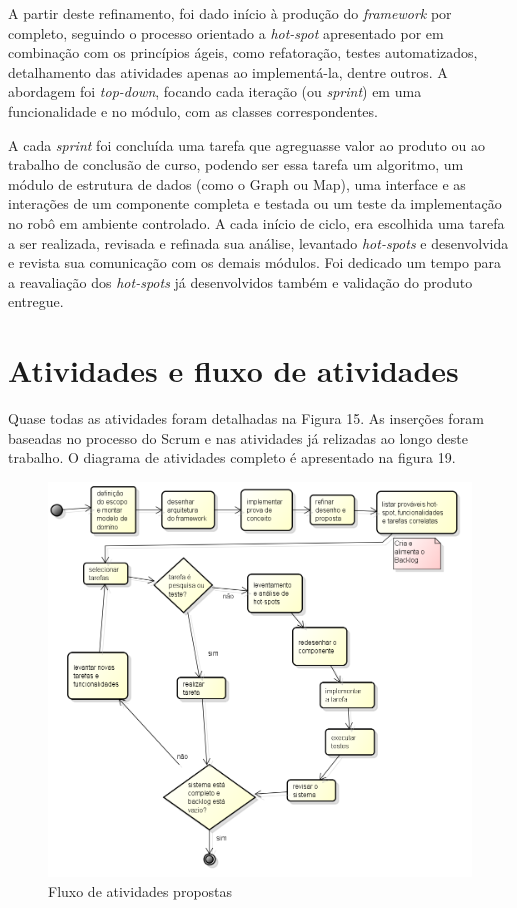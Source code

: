 A partir deste refinamento, foi dado início à produção do \textit{framework} por completo, seguindo o processo orientado a \textit{hot-spot} apresentado por \cite{Fayad1999} em combinação com os princípios ágeis, como refatoração, testes automatizados, detalhamento das atividades apenas ao implementá-la, dentre outros. A abordagem foi \textit{top-down}, focando cada iteração (ou \textit{sprint}) em uma funcionalidade e no módulo, com as classes correspondentes.

A cada \textit{sprint} foi concluída uma tarefa que agreguasse valor ao produto ou ao trabalho de conclusão de curso, podendo ser essa tarefa um algoritmo, um módulo de estrutura de dados (como o Graph ou Map), uma interface e as interações de um componente completa e testada ou um teste da implementação no robô em ambiente controlado. A cada início de ciclo, era escolhida uma tarefa a ser realizada, revisada e refinada sua análise, levantado \textit{hot-spots} e desenvolvida e revista sua comunicação com os demais módulos. Foi dedicado um tempo para a reavaliação dos \textit{hot-spots} já desenvolvidos também e validação do produto entregue.

\section{Atividades e fluxo de atividades}

Quase todas as atividades foram detalhadas na Figura 15. As inserções foram baseadas no processo do Scrum e nas atividades já relizadas ao longo deste trabalho. O diagrama de atividades completo é apresentado na figura 19.

\begin{figure}[h]
	\centering
	\label{fig19}
		\includegraphics[keepaspectratio=true,scale=0.68]{figuras/fluxoatvd.png}
	\caption{Fluxo de atividades propostas}
\end{figure}

